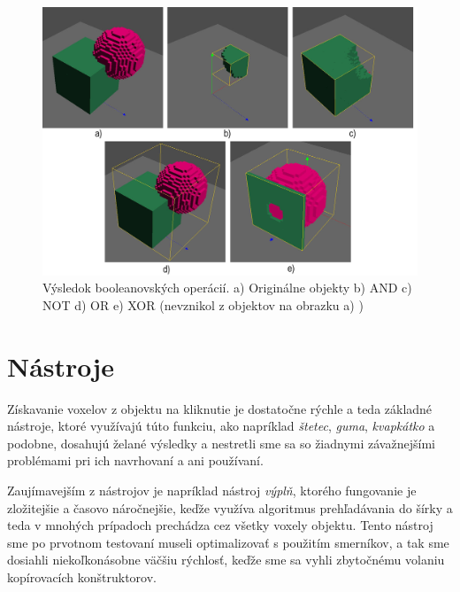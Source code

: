 \begin{figure}[!h]
	\centering
	\includegraphics[width=1.0\textwidth]{bools.png}
	\caption[Booleanovské operácie]{Výsledok booleanovských operácií. a) Originálne objekty b) AND c) NOT d) OR e) XOR (nevznikol z objektov na obrazku a) )}
	\label{bools}
\end{figure}

\section{Nástroje}
Získavanie voxelov z objektu na kliknutie je dostatočne rýchle a teda základné nástroje, ktoré využívajú túto funkciu, ako napríklad \textit{štetec}, \textit{guma}, \textit{kvapkátko} a podobne, dosahujú želané výsledky a nestretli sme sa so žiadnymi závažnejšími problémami pri ich navrhovaní a ani používaní.

Zaujímavejším z nástrojov je napríklad nástroj \textit{výplň}, ktorého fungovanie je zložitejšie a časovo náročnejšie, keďže využíva algoritmus prehľadávania do šírky a teda v mnohých prípadoch prechádza cez všetky voxely objektu. Tento nástroj sme po prvotnom testovaní museli optimalizovať s použitím smerníkov, a tak sme dosiahli niekoľkonásobne väčšiu rýchlosť, keďže sme sa vyhli zbytočnému volaniu kopírovacích konštruktorov. 
 
